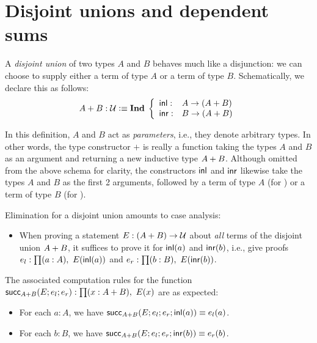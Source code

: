 
\section{Disjoint unions and dependent sums}
A \emph{disjoint union} of two types $A$ and $B$ behaves much like a disjunction: we can choose to supply either a term of type $A$ or a term of type $B$. Schematically, we declare this as follows:
\[ A + B : \mathcal{U} \vcentcolon\equiv \mathbf{Ind \;} \left\{
\begin{array}{ll}
\mathsf{inl} : & A \to (A + B) \\
\mathsf{inr} : & B \to (A + B)
\end{array}
\right. \]

In this definition, $A$ and $B$ act as \emph{parameters}, i.e., they denote arbitrary types. In other words, the type constructor $+$ is really a function taking the types $A$ and $B$ as an argument and returning a new inductive type $A + B$. Although omitted from the above schema for clarity, the constructors $\mathsf{inl}$ and $\mathsf{inr}$ likewise take the types $A$ and $B$ as the first 2 arguments, followed by a term of type $A$ (for \inl) or a term of type $B$ (for \inr).

Elimination for a disjoint union amounts to case analysis:
\begin{itemize}
\item When proving a statement $E : (A + B) \to \mathcal{U}$ about \emph{all} terms of the disjoint union $A + B$, it suffices to prove it for $\mathsf{inl}(a)$ and $\mathsf{inr}(b)$, i.e., give proofs $e_l : \prd{a:A} E(\inl(a))$ and $e_r : \prd{b:B} E(\inr(b))$.
\end{itemize}
The associated computation rules for the function $\rec_{\disj{A}{B}}(E;e_l;e_r) : \prd{x:\disj{A}{B}} E(x)$ are as expected:
\begin{itemize}
\item For each $a : A$, we have $\mathsf{succ}_{A + B}(E;e_l;e_r;\mathsf{inl}(a)) \equiv e_l(a)$.
\item For each $b : B$, we have $\mathsf{succ}_{A + B}(E;e_l;e_r;\mathsf{inr}(b)) \equiv e_r(b)$.
\end{itemize}

